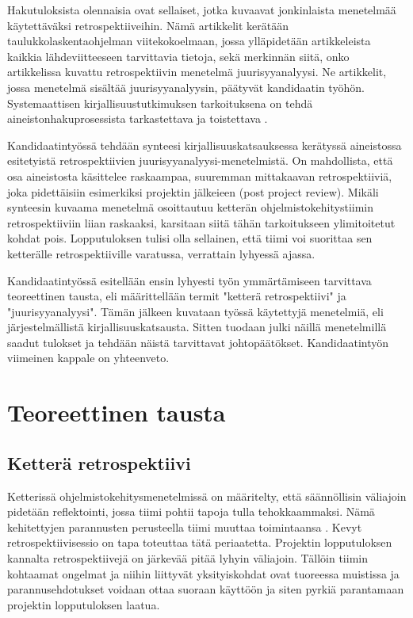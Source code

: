 Hakutuloksista olennaisia ovat sellaiset, jotka kuvaavat jonkinlaista menetelmää käytettäväksi retrospektiiveihin. Nämä artikkelit kerätään taulukkolaskentaohjelman viitekokoelmaan, jossa ylläpidetään artikkeleista kaikkia lähdeviitteeseen tarvittavia tietoja, sekä merkinnän siitä, onko artikkelissa kuvattu retrospektiivin menetelmä juurisyyanalyysi. Ne artikkelit, jossa menetelmä sisältää juurisyyanalyysin, päätyvät kandidaatin työhön. Systemaattisen kirjallisuustutkimuksen tarkoituksena on tehdä aineistonhakuprosessista tarkastettava ja toistettava \citep{Kitchenham2007}.

Kandidaatintyössä tehdään synteesi kirjallisuuskatsauksessa kerätyssä aineistossa esitetyistä retrospektiivien juurisyyanalyysi-menetelmistä. On mahdollista, että osa aineistosta käsittelee raskaampaa, suuremman mittakaavan retrospektiiviä, joka pidettäisiin esimerkiksi projektin jälkeieen (post project review). Mikäli synteesin kuvaama menetelmä osoittautuu ketterän ohjelmistokehitystiimin retrospektiiviin liian raskaaksi, karsitaan siitä tähän tarkoitukseen ylimitoitetut kohdat pois. Lopputuloksen tulisi olla sellainen, että tiimi voi suorittaa sen ketterälle retrospektiiville varatussa, verrattain lyhyessä ajassa.

Kandidaatintyössä esitellään ensin lyhyesti työn ymmärtämiseen tarvittava teoreettinen tausta, eli määrittellään termit "ketterä retrospektiivi" ja "juurisyyanalyysi". Tämän jälkeen kuvataan työssä käytettyjä menetelmiä, eli järjestelmällistä kirjallisuuskatsausta. Sitten tuodaan julki näillä menetelmillä saadut tulokset ja tehdään näistä tarvittavat johtopäätökset. Kandidaatintyön viimeinen kappale on yhteenveto.

\section{Teoreettinen tausta}
\subsection{Ketterä retrospektiivi}
Ketterissä ohjelmistokehitysmenetelmissä on määritelty, että säännöllisin väliajoin pidetään reflektointi, jossa tiimi pohtii tapoja tulla tehokkaammaksi. Nämä kehitettyjen parannusten perusteella tiimi muuttaa toimintaansa \citep{AgileManifestoPrinciples}. Kevyt retrospektiivisessio on tapa toteuttaa tätä periaatetta. Projektin lopputuloksen kannalta retrospektiivejä on järkevää pitää lyhyin väliajoin. Tällöin tiimin kohtaamat ongelmat ja niihin liittyvät yksityiskohdat ovat tuoreessa muistissa ja parannusehdotukset voidaan ottaa suoraan käyttöön ja siten pyrkiä parantamaan projektin lopputuloksen laatua. \citep{Cockburn2002}

